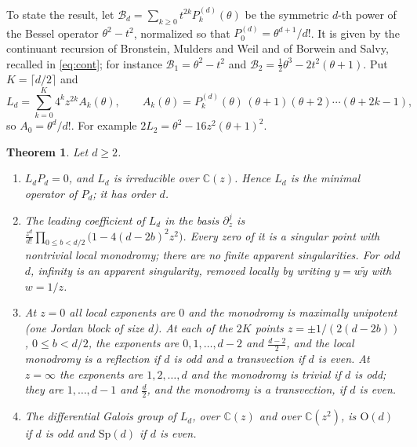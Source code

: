 \documentclass[11pt]{amsart}
\newtheorem{theorem}{Theorem}
\theoremstyle{definition}
\newcommand{\C}{\mathbb C}
\newcommand{\cB}{\mathcal B}
\newcommand{\Sp}{\mathrm{Sp}}
\newcommand{\Ort}{\mathrm{O}}
\begin{document}
To state the result, let $\cB_d=\sum_{k\ge0}t^{2k}P^{(d)}_k(\theta)$ be the symmetric $d$-th power of the Bessel operator $\theta^2-t^2$, normalized so that $P^{(d)}_0=\theta^{d+1}/d!$. It is given by the continuant recursion of Bronstein, Mulders and Weil and of Borwein and Salvy, recalled in \eqref{eq:cont}; for instance $\cB_1=\theta^2-t^2$ and $\cB_2=\frac12\theta^3-2t^2(\theta+1)$. Put $K=\lceil d/2\rceil$ and
\begin{equation}\label{eq:Ld}
L_d=\sum_{k=0}^{K}4^kz^{2k}A_k(\theta),\qquad A_k(\theta)=P^{(d)}_k(\theta)\,(\theta+1)(\theta+2)\cdots(\theta+2k-1),
\end{equation}
so $A_0=\theta^d/d!$. For example $2L_2=\theta^2-16z^2(\theta+1)^2$.

\begin{theorem}\label{thm:A}
Let $d\ge2$.
\begin{enumerate}[label=\textup{(\roman*)}]
\item $L_dP_d=0$, and $L_d$ is irreducible over $\C(z)$. Hence $L_d$ is the minimal operator of $P_d$; it has order $d$.
\item The leading coefficient of $L_d$ in the basis $\partial_z^j$ is $\frac{z^d}{d!}\prod_{0\le b<d/2}\bigl(1-4(d-2b)^2z^2\bigr)$. Every zero of it is a singular point with nontrivial local monodromy; there are no finite apparent singularities. For odd $d$, infinity is an apparent singularity, removed locally by writing $y=w\widetilde y$ with $w=1/z$.
\item At $z=0$ all local exponents are $0$ and the monodromy is maximally unipotent \textup{(}one Jordan block of size $d$\textup{)}. At each of the $2K$ points $z=\pm1/(2(d-2b))$, $0\le b<d/2$, the exponents are $0,1,\dots,d-2$ and $\frac{d-2}2$, and the local monodromy is a reflection if $d$ is odd and a transvection if $d$ is even. At $z=\infty$ the exponents are $1,2,\dots,d$ and the monodromy is trivial if $d$ is odd; they are $1,\dots,d-1$ and $\frac d2$, and the monodromy is a transvection, if $d$ is even.
\item The differential Galois group of $L_d$, over $\C(z)$ and over $\C(z^2)$, is $\Ort(d)$ if $d$ is odd and $\Sp(d)$ if $d$ is even.
\end{enumerate}
\end{theorem}
\end{document}
